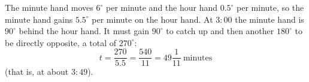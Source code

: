 The minute hand moves $6^\circ$ per minute and the hour hand $0.5^\circ$ per minute, so the minute hand gains $5.5^\circ$ per minute on the hour hand. At $3{:}00$ the minute hand is $90^\circ$ behind the hour hand. It must gain $90^\circ$ to catch up and then another $180^\circ$ to be directly opposite, a total of $270^\circ$:
\[t=\dfrac{270}{5.5}=\dfrac{540}{11}=\boxed{49\dfrac{1}{11}}\ \text{minutes}\]
(that is, at about $3{:}49$).
